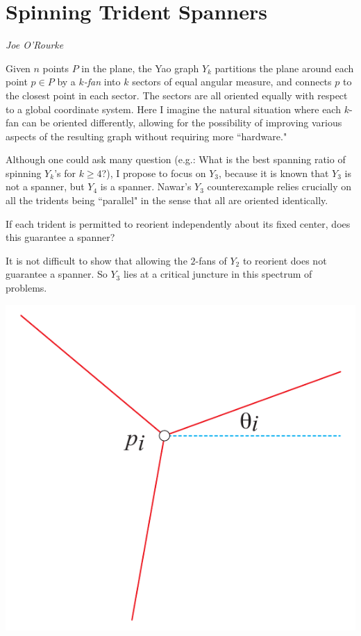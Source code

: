 \documentclass{patmorin}
\begin{document}
\section{Spinning Trident Spanners}

\noindent\emph{Joe O'Rourke}

Given $n$ points $P$ in the plane,
the Yao graph $Y_k$ partitions the plane around each point $p \in P$ by a \emph{$k$-fan}
into $k$ sectors of equal
angular measure, and connects $p$ to the closest point in each sector.
The sectors are all oriented equally with respect to a global coordinate system.
Here I imagine the natural situation where each $k$-fan can be oriented differently,
allowing for the possibility of improving various aspects of the resulting graph
without requiring more ``hardware."

Although one could ask many question (e.g.: What is the best spanning ratio of
spinning $Y_k$'s for $k \ge 4$?), I propose to focus on
$Y_3$, because it is known that $Y_3$ is not a spanner, %
but $Y_4$ is a spanner. 
Nawar's $Y_3$ counterexample relies crucially on all the tridents being ``parallel"
in the sense that all are oriented identically.

\begin{op}
If each trident is permitted to reorient 
independently about its fixed center,
does this guarantee a spanner?
\end{op}


It is not difficult to show that allowing the $2$-fans of $Y_2$ to reorient does not
guarantee a spanner.  So $Y_3$ lies at a critical juncture in this spectrum of problems.
\begin{center}
   \includegraphics{figs/trident}
\end{center}
\end{document}
